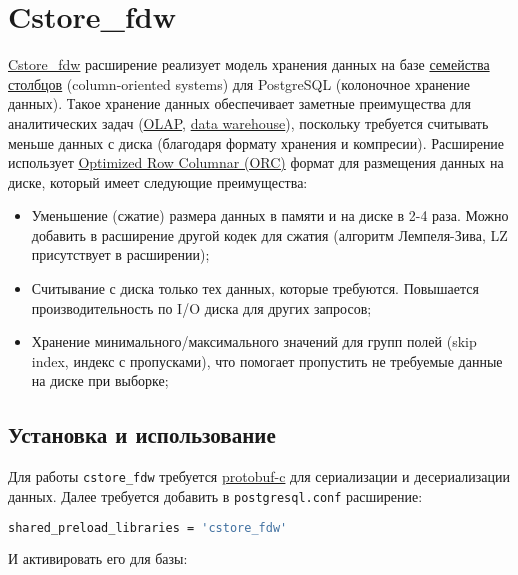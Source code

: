 \section{Cstore\_fdw}

\href{https://citusdata.github.io/cstore\_fdw/}{Cstore\_fdw} расширение реализует модель хранения данных на базе \href{https://en.wikipedia.org/wiki/Column-oriented\_DBMS}{семейства столбцов} (column-oriented systems) для PostgreSQL (колоночное хранение данных). Такое хранение данных обеспечивает заметные преимущества для аналитических задач (\href{https://ru.wikipedia.org/wiki/OLAP}{OLAP}, \href{https://en.wikipedia.org/wiki/Data\_warehouse}{data warehouse}), поскольку требуется считывать меньше данных с диска (благодаря формату хранения и компресии). Расширение использует \href{https://cwiki.apache.org/confluence/display/Hive/LanguageManual+ORC#LanguageManualORC-ORCFileFormat}{Optimized Row Columnar (ORC)} формат для размещения данных на диске, который имеет следующие преимущества:

\begin{itemize}
  \item Уменьшение (сжатие) размера данных в памяти и на диске в 2-4 раза. Можно добавить в расширение другой кодек для сжатия (алгоритм Лемпеля-Зива, LZ присутствует в расширении);
  \item Считывание с диска только тех данных, которые требуются. Повышается производительность по I/O диска для других запросов;
  \item Хранение минимального/максимального значений для групп полей (skip index, индекс с пропусками), что помогает пропустить не требуемые данные на диске при выборке;
\end{itemize}


\subsection{Установка и использование}

Для работы \lstinline!cstore_fdw! требуется \href{https://github.com/protobuf-c/protobuf-c}{protobuf-c} для сериализации и десериализации данных. Далее требуется добавить в \lstinline!postgresql.conf! расширение:

\begin{lstlisting}[language=Bash,label=lst:cstore1,caption=Cstore\_fdw]
shared_preload_libraries = 'cstore_fdw'
\end{lstlisting}

И активировать его для базы:

